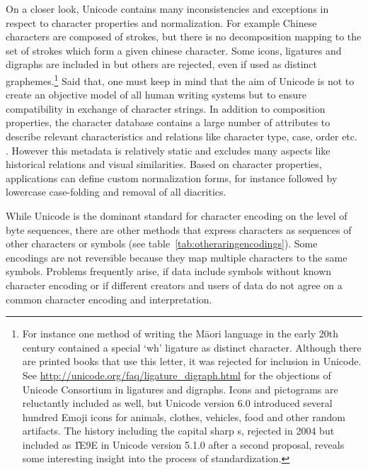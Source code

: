 On a closer look, Unicode contains many inconsistencies and exceptions in
respect to character properties and normalization. For example Chinese
characters are composed of strokes, but there is no decomposition mapping
to the set of strokes which form a given chinese character. Some icons,
ligatures and digraphs are included in  but others are rejected,
even if used as distinct graphemes.\footnote{For instance one method of writing
the M\=aori language in the early 20th century contained a special `wh' ligature
as distinct character. Although there are printed books that use this letter,
it was rejected for inclusion in Unicode. See 
\url{http://unicode.org/faq/ligature_digraph.html} for the objections of 
Unicode Consortium in ligatures and digraphs. Icons and pictograms are
reluctantly included as well, but Unicode version 6.0 introduced
several hundred Emoji icons for animals, clothes, vehicles, food and other
random artifacts. The history including the capital sharp s, rejected in
2004 but included as \U{1E9E} in Unicode version 5.1.0 after a second
proposal, reveals some interesting insight into the process of standardization.}
Said that, one must keep in mind that the aim of Unicode is not to create an
objective model of all human writing systems but to ensure compatibility in
exchange of character strings. In addition to composition properties, the
character database contains a large number of attributes to describe
relevant characteristics and relations like character type, case, order
etc. \cite{Whistler2008}. However this metadata is relatively static and
excludes many aspects like historical relations and visual similarities.
Based on character properties, applications can define custom
normalization forms, for instance  followed by
lowercase case-folding and removal of all diacritics.

While Unicode is the dominant standard for character encoding on the level of
byte sequences, there are other methods that express characters as sequences
of other characters or symbols (see table~\ref{tab:otheraringencodings}).
Some encodings are not reversible because they map multiple characters to the
same symbols. Problems frequently arise, if data include symbols without known
character encoding or if different creators and users of data do not agree on
a common character encoding and interpretation.

